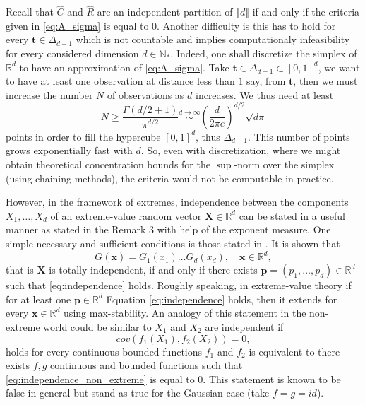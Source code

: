 \documentclass[11pt]{article}
\begin{document}
	Recall that $\hat{C}$ and $\hat{R}$ are an independent partition of $\llbracket d \rrbracket$ if and only if the criteria given in \eqref{eq:A_sigma} is equal to $0$. Another difficulty is this has to hold for every $\textbf{t} \in \Delta_{d-1}$ which is not countable and implies computationaly infeasibility for every considered dimension $d \in \mathbb{N}_*$. Indeed, one shall discretize the simplex of $\mathbb{R}^d$ to have an approximation of \eqref{eq:A_sigma}. Take $\textbf{t} \in \Delta_{d-1} \subset [0,1]^d$, we want to have at least one observation at distance less than $1$ say, from $\textbf{t}$, then we must increase the number $N$ of observations as $d$ increases. We thus need at least
	\begin{equation*}
	N \geq \frac{\Gamma(d/2 + 1)}{\pi^{d/2}} \overset{d \rightarrow \infty}{\sim} \left( \frac{d}{2 \pi e} \right)^{d/2} \sqrt{d \pi}
	\end{equation*}
	points in order to fill the hypercube $[0,1]^d$, thus $\Delta_{d-1}$. This number of points grows exponentially fast with $d$. So, even with discretization, where we might obtain theoretical concentration bounds for the $\sup$-norm over the simplex (using chaining methods), the criteria would not be computable in practice.
	
	However, in the framework of extremes, independence between the components $X_1, \dots, X_d$ of an extreme-value random vector $\textbf{X} \in \mathbb{R}^d$ can be stated in a useful manner as stated in the Remark 3 with help of the exponent measure. One simple necessary and sufficient conditions is those stated in \cite{Takahashi1987SomePO, takahashi1994asymptotic}. It is shown that
	\begin{equation}
	\label{eq:independence}
		G(\textbf{x}) = G_1(x_1) \dots G_d(x_d), \quad \textbf{x} \in \mathbb{R}^d,
	\end{equation}
	 that is $\textbf{X}$ is totally independent, if and only if there exists $\textbf{p} = (p_1, \dots, p_d) \in \mathbb{R}^d$ such that \eqref{eq:independence} holds. Roughly speaking, in extreme-value theory if for at least one $\textbf{p} \in \mathbb{R}^d$ Equation \eqref{eq:independence} holds, then it extends for every $\textbf{x} \in \mathbb{R}^d$ using max-stability. An analogy of this statement in the non-extreme world could be similar to $X_1$ and $X_2$ are independent if
	 \begin{equation}
	 	\label{eq:independence_non_extreme}
	 	cov(f_1(X_1), f_2(X_2)) = 0,
	 \end{equation}
	 holds for every continuous bounded functions $f_1$ and $f_2$ is equivalent to there exists $f,g$ continuous and bounded functions such that \eqref{eq:independence_non_extreme} is equal to $0$. This statement is known to be false in general but stand as true for the Gaussian case (take $f = g = id$). 
	 
\end{document}
